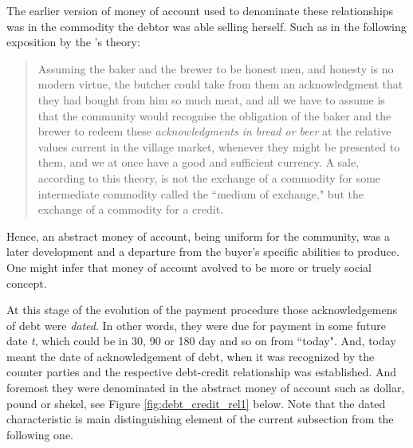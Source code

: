 The earlier version of money of account used to denominate these relationships was in the commodity the debtor was able selling herself. Such as in the following exposition by the \citeauthor{innes1913}'s theory:

\begin{quote}
Assuming the baker and the brewer to be honest men, and honesty is
no modern virtue, the butcher could take from them an acknowledgment
that they had bought from him so much meat, and all we have to assume
is that the community would recognise the obligation of the baker and the 
brewer to redeem these \textit{acknowledgments in bread or beer} at the relative
values current in the village market, whenever they might be presented to
them, and we at once have a good and sufficient currency. A sale,
according to this theory, is not the exchange of a commodity for some
intermediate commodity called the ``medium of exchange," but the
exchange of a commodity for a credit.~\citep[p.~391, emphasis added]{innes1913}
\end{quote}

Hence, an abstract money of account, being uniform for the community, was a later development and a departure from the buyer's specific abilities to produce. One might infer that money of account avolved to be more or truely social concept.

At this stage of the evolution of the payment procedure those acknowledgemens of debt were \textit{dated}. In other words, they were due for payment in some future date \textit{t}, which could be in 30, 90 or 180 day and so on from ``today". And, today meant the date of acknowledgement of debt, when it was recognized by the counter parties and the respective debt-credit relationship was established. And foremost they were denominated in the abstract money of account such as dollar, pound or shekel, see Figure \ref{fig:debt_credit_rel1} below. Note that the dated characteristic is main distinguishing element of the current subsection from the following one.


